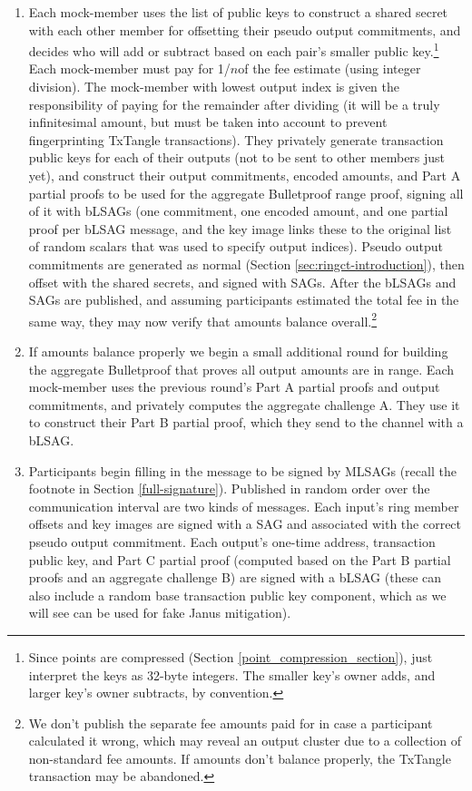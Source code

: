 \begin{enumerate}
    \item Each mock-member uses the list of public keys to construct a shared secret with each other member for offsetting their pseudo output commitments, and decides who will add or subtract based on each pair's smaller public key.\footnote{Since points are compressed (Section \ref{point_compression_section}), just interpret the keys as 32-byte integers. The smaller key's owner adds, and larger key's owner subtracts, by convention.} Each mock-member must pay for 1/$n$\nth of the fee estimate (using integer division). The mock-member with lowest output index is given the responsibility of paying for the remainder after dividing (it will be a truly infinitesimal amount, but must be taken into account to prevent fingerprinting TxTangle transactions). They privately generate transaction public keys for each of their outputs (not to be sent to other members just yet), and construct their output commitments, encoded amounts, and Part A partial proofs to be used for the aggregate Bulletproof range proof, signing all of it with bLSAGs (one commitment, one encoded amount, and one partial proof per bLSAG message, and the key image links these to the original list of random scalars that was used to specify output indices). Pseudo output commitments are generated as normal (Section \ref{sec:ringct-introduction}), then offset with the shared secrets, and signed with SAGs. After the bLSAGs and SAGs are published, and assuming participants estimated the total fee in the same way, they may now verify that amounts balance overall.\footnote{We don't publish the separate fee amounts paid for in case a participant calculated it wrong, which may reveal an output cluster due to a collection of non-standard fee amounts. If amounts don't balance properly, the TxTangle transaction may be abandoned.}
    \item If amounts balance properly we begin a small additional round for building the aggregate Bulletproof that proves all output amounts are in range. Each mock-member uses the previous round's Part A partial proofs and output commitments, and privately computes the aggregate challenge A. They use it to construct their Part B partial proof, which they send to the channel with a bLSAG.
    \item Participants begin filling in the message to be signed by MLSAGs (recall the footnote in Section \ref{full-signature}). Published in random order over the communication interval are two kinds of messages. Each input's ring member offsets and key images are signed with a SAG and associated with the correct pseudo output commitment. Each output's one-time address, transaction public key, and Part C partial proof (computed based on the Part B partial proofs and an aggregate challenge B) are signed with a bLSAG (these can also include a random base transaction public key component, which as we will see can be used for fake Janus mitigation).

\end{enumerate}
